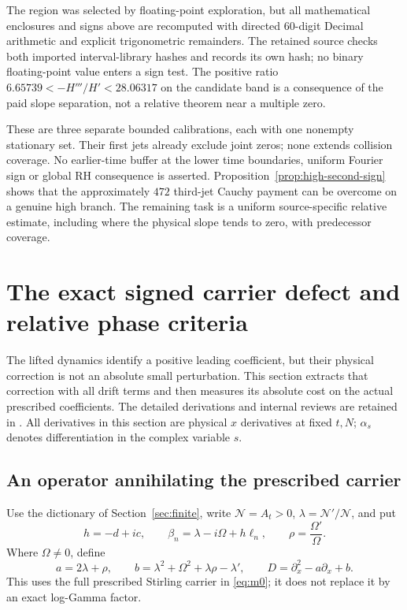 \documentclass[11pt]{article}
\theoremstyle{definition}
\theoremstyle{remark}
\begin{document}
The region was selected by floating-point exploration, but all
mathematical enclosures and signs above are recomputed with directed
60-digit Decimal arithmetic and explicit trigonometric remainders.
The retained source checks both imported interval-library hashes and
records its own hash; no binary floating-point value enters a sign test.
The positive ratio
$6.65739<-H'''/H'<28.06317$ on the candidate band is a consequence
of the paid slope separation, not a relative theorem near a multiple zero.


These are three separate bounded calibrations, each with one nonempty
stationary set. Their first jets already exclude joint zeros; none
extends collision coverage. No earlier-time buffer at the lower time
boundaries, uniform Fourier sign or global RH consequence is asserted.
Proposition~\ref{prop:high-second-sign} shows that the approximately
$472$ third-jet Cauchy payment can be overcome on a genuine high branch.
The remaining task is a uniform source-specific relative estimate,
including where the physical slope tends to zero, with predecessor coverage.

\section{The exact signed carrier defect and relative phase criteria}
\label{sec:signed-carrier}

The lifted dynamics identify a positive leading coefficient, but their
physical correction is not an absolute small perturbation. This section
extracts that correction with all drift terms and then measures its
absolute cost on the actual prescribed coefficients. The detailed
derivations and internal reviews are retained in
\cite{signedcontinuation}. All derivatives in this section are physical
$x$ derivatives at fixed $t,N$; $\alpha_s$ denotes differentiation in the
complex variable $s$.

\subsection{An operator annihilating the prescribed carrier}

Use the dictionary of Section~\ref{sec:finite}, write
$\mathcal N=A_t>0$, $\lambda=\mathcal N'/\mathcal N$, and put
\[
 h=-d+ic,\qquad \beta_n=\lambda-i\Omega+h\ell_n,\qquad
 \rho=\frac{\Omega'}{\Omega}.
\]
Where $\Omega\ne0$, define
\begin{equation}
 a=2\lambda+\rho,\qquad
 b=\lambda^2+\Omega^2+\lambda\rho-\lambda',
 \qquad D=\partial_x^2-a\partial_x+b.
 \label{eq:carrier-operator}
\end{equation}
This uses the full prescribed Stirling carrier in \eqref{eq:m0};
it does not replace it by an exact log-Gamma factor.
\end{document}
